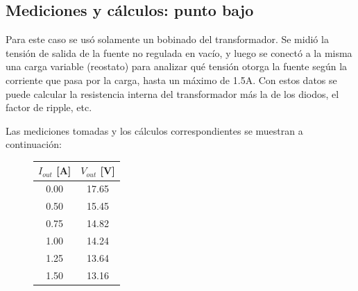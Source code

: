 \documentclass[chaptersright]{informeutn}
\begin{document}
      \subsection{Mediciones y cálculos: punto bajo}
        Para este caso se usó solamente un bobinado del transformador. Se midió la tensión de salida de la fuente no
        regulada en vacío, y luego se conectó a la misma una carga variable (reostato) para analizar qué tensión
        otorga la fuente según la corriente que pasa por la carga, hasta un máximo de 1.5A. Con estos datos se puede
        calcular la resistencia interna del transformador más la de los diodos, el factor de ripple, etc.

        Las mediciones tomadas y los cálculos correspondientes se muestran a continuación:

        \begin{figure}[H]
        \begin{minipage}{0.35\textwidth}
        \centering
        \begin{tabular}{|c|c|}
        \hline
        $I_{out}$ [A] & $V_{out}$ [V] \\
        \hline
        0.00 & 17.65 \\
        0.50 & 15.45 \\
        0.75 & 14.82 \\
        1.00 & 14.24 \\
        1.25 & 13.64 \\
        1.50 & 13.16 \\
        \hline
        \end{tabular}
        \end{minipage}
        \begin{minipage}{0.35\textwidth}
\end{minipage}
\end{figure}
\end{document}
